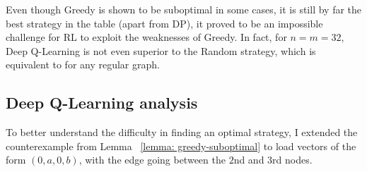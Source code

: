 Even though Greedy is shown to be suboptimal in some cases, it is still by far the best strategy in the table (apart from DP), it proved to be an impossible challenge for RL to exploit the weaknesses of Greedy. In fact, for $n=m=32$, Deep Q-Learning is not even superior to the Random strategy, which is equivalent to \OneChoice for any regular graph.


\subsection{Deep Q-Learning analysis}

To better understand the difficulty in finding an optimal strategy, I extended the \CycleGraph counterexample from Lemma ~\ref{lemma: greedy-suboptimal} to load vectors of the form $(0, a, 0, b)$, with the edge going between the $2$nd and $3$rd nodes. 


